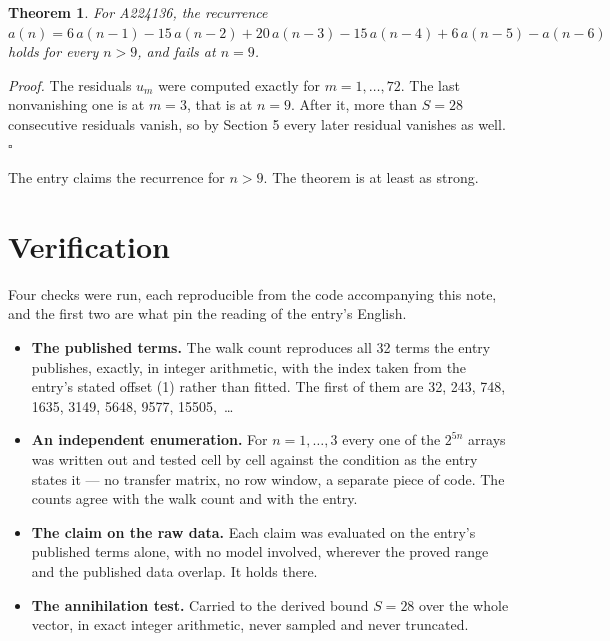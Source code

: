 \documentclass[11pt]{article}
\newtheorem{theorem}{Theorem}
\theoremstyle{definition}
\begin{document}
\begin{theorem} For A224136, the recurrence $a(n) = 6\,a(n-1) - 15\,a(n-2) + 20\,a(n-3) - 15\,a(n-4) + 6\,a(n-5) - a(n-6)$ holds for every $n > 9$, and fails at $n = 9$.\end{theorem}

{\itshape Proof.} The residuals $u_m$ were computed exactly for $m = 1,\dots,72$. The last nonvanishing one is at $m = 3$, that is at $n = 9$. After it, more than $S = 28$ consecutive residuals vanish, so by Section 5 every later residual vanishes as well. $\square$

The entry claims the recurrence for $n > 9$. The theorem is at least as strong.

\section{Verification}

Four checks were run, each reproducible from the code accompanying this note, and the first two are what pin the reading of the entry's English.

\begin{itemize}

\item {\bfseries The published terms.} The walk count reproduces all 32 terms the entry publishes, exactly, in integer arithmetic, with the index taken from the entry's stated offset (1) rather than fitted. The first of them are 32, 243, 748, 1635, 3149, 5648, 9577, 15505,~\dots

\item {\bfseries An independent enumeration.} For $n = 1,\dots,3$ every one of the $2^{5n}$ arrays was written out and tested cell by cell against the condition as the entry states it --- no transfer matrix, no row window, a separate piece of code. The counts agree with the walk count and with the entry.

\item {\bfseries The claim on the raw data.} Each claim was evaluated on the entry's published terms alone, with no model involved, wherever the proved range and the published data overlap. It holds there.

\item {\bfseries The annihilation test.} Carried to the derived bound $S = 28$ over the whole vector, in exact integer arithmetic, never sampled and never truncated.

\end{itemize}
\end{document}
